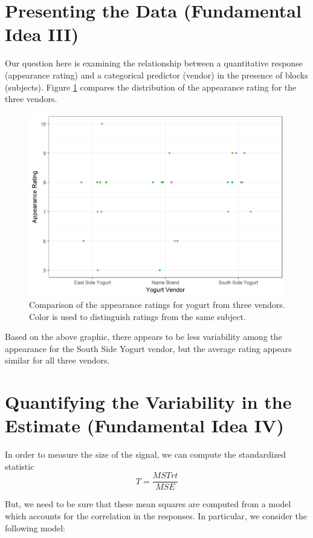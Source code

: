 \documentclass[]{book}
\theoremstyle{plain}
\theoremstyle{mydefn}
\theoremstyle{myexmpl}
\theoremstyle{remark}
\begin{document}
\section{Presenting the Data (Fundamental Idea
III)}\label{presenting-the-data-fundamental-idea-iii-2}

Our question here is examining the relationship between a quantitative
response (appearance rating) and a categorical predictor (vendor) in the
presence of blocks (subjects). Figure \ref{fig:blockrecap-plot} compares
the distribution of the appearance rating for the three vendors.

\begin{figure}

{\centering \includegraphics[width=0.8\linewidth]{./Images/blockrecap-plot-1} 

}

\caption{Comparison of the appearance ratings for yogurt from three vendors. Color is used to distinguish ratings from the same subject.}\label{fig:blockrecap-plot}
\end{figure}

Based on the above graphic, there appears to be less variability among
the appearance for the South Side Yogurt vendor, but the average rating
appears similar for all three vendors.

\section{Quantifying the Variability in the Estimate (Fundamental Idea
IV)}\label{quantifying-the-variability-in-the-estimate-fundamental-idea-iv-2}

In order to measure the size of the signal, we can compute the
standardized statistic \[T = \frac{MSTrt}{MSE}\]

But, we need to be sure that these mean squares are computed from a
model which accounts for the correlation in the responses. In
particular, we consider the following model:
\end{document}
